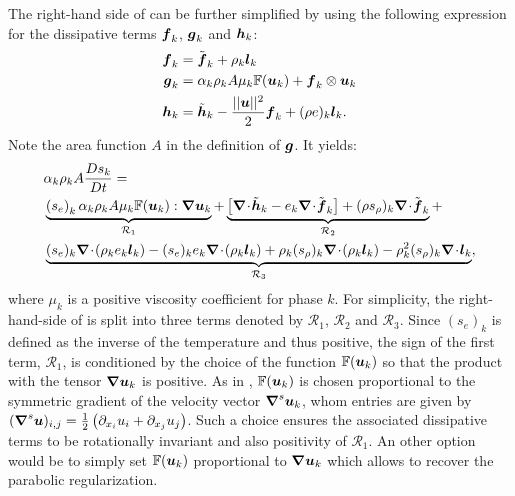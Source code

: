 The right-hand side of  can be further simplified by using the following expression
for the dissipative terms $\boldsymbol f_k$,  $\boldsymbol g_k$ and $\boldsymbol h_k$:
\begin{align}\label{eq:def-diss-terms-sect4}
  \boldsymbol f_k &= \tilde{\boldsymbol f}_k + \rho_k \boldsymbol l_k 
  \\
  \boldsymbol g_k &= \alpha_k \rho_k A \mu_k \mathbb{F}(\boldsymbol u_k) + \boldsymbol f_k \otimes \boldsymbol u_k
  \\
  \boldsymbol h_k &= \tilde{\boldsymbol h}_k - \frac{|| \boldsymbol u||^2 }{2} \boldsymbol f_k + (\rho e)_k \boldsymbol l_k.
\end{align}
Note the area function $A$ in the definition of $\boldsymbol g$. It yields:
%
\begin{align}\label{eq:ent-res-7-eqn-diss-terms2}
&\alpha_k \rho_k A \frac{Ds_k}{Dt} = \nonumber \\
&\underbrace{\left(s_e\right)_k \alpha_k \rho_k A \mu_k \mathbb{F}(\mbold u_k) : \grad \mbold u_k}_{\mathcal{R}_1} +
\underbrace{\left[ \div \tilde{\mbold h}_k  - e_k \div \tilde{\mbold f}_k  \right] + (\rho s_\rho)_k \div \tilde{\mbold f}_k}_{\mathcal{R}_2} + \nonumber \\
&\underbrace{(s_e)_k \div \left( \rho_k e_k \mbold l_k \right) -  (s_e)_k e_k \div \left( \rho_k \mbold l_k \right) + \rho_k (s_\rho)_k \div \left( \rho_k \mbold l_k \right) 
  - \rho_k^2 (s_\rho)_k \div \mbold l_k}_{\mathcal{R}_3},
\end{align}
%
where $\mu_k$ is a positive viscosity coefficient for phase $k$. For simplicity, the right-hand-side of  is split into three terms denoted by $\mathcal{R}_1$, $\mathcal{R}_2$ and $\mathcal{R}_3$. Since $(s_e)_k$ is defined as the inverse of the temperature and thus positive, the sign of the first term, $\mathcal{R}_1$, is conditioned by the choice of the function $\mathbb{F}(\boldsymbol u_k)$ so that the product with the tensor $\boldsymbol{\nabla} \boldsymbol u_k$ is positive. As in \cite{jlg}, $\mathbb{F}(\boldsymbol u_k)$ is chosen proportional to the symmetric gradient of the velocity vector $\boldsymbol{\nabla}^s \boldsymbol u_k$, whom entries are given by $(\boldsymbol{\nabla}^s \boldsymbol u)_{i,j} = \frac{1}{2} \left( \partial_{x_i} u_i + \partial_{x_j} u_j \right)$. Such a choice ensures the associated dissipative terms to be rotationally invariant and also positivity of $\mathcal{R}_1$. An other option would be to simply set $\mathbb{F}(\boldsymbol u_k)$ proportional to $\boldsymbol{\nabla} \boldsymbol u_k$ which allows to recover the parabolic regularization. 

